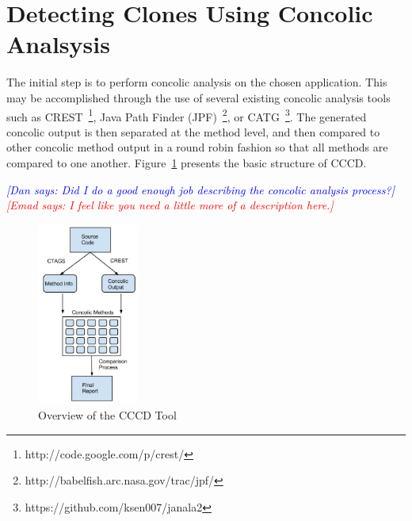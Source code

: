 \documentclass{sig-alternate}
\newcommand{\emad}[1]{\textcolor{red}{{\it [Emad says: #1]}}}
\newcommand{\dan}[1]{\textcolor{blue}{{\it [Dan says: #1]}}}
\begin{document}



\section{Detecting Clones Using Concolic Analsysis} 
\label{sec: howconcolicworks}


The initial step is to perform concolic analysis on the chosen application. This may be accomplished through the use of several existing concolic analysis tools such as CREST~\footnote{http://code.google.com/p/crest/}, Java Path Finder (JPF)~\footnote{http://babelfish.arc.nasa.gov/trac/jpf/}, or CATG~\footnote{https://github.com/ksen007/janala2}. The generated concolic output is then separated at the method level, and then compared to other concolic method output in a round robin fashion so that all methods are compared to one another. Figure~\ref{fig:cccdstructure} presents the basic structure of CCCD.

\dan{Did I do a good enough job describing the concolic analysis process?}
\emad{I feel like you need a little more of a description here.}

\begin{figure}[thb!]
\vspace{2mm}
\centering
\includegraphics[width=33mm,height=60mm]{images/CCCDStructure_2.jpg}
\caption{Overview of the CCCD Tool~\cite{wcre2013}}
\label{fig:cccdstructure} %
\end{figure}



\end{document}
